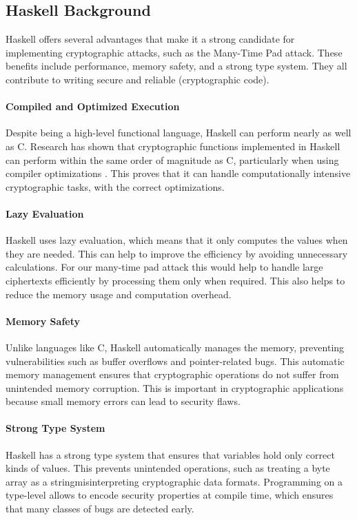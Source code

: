 \subsection{Haskell Background}
\label{sec:why_haskell}
Haskell offers several advantages that make it a strong candidate for implementing cryptographic attacks, 
such as the Many-Time Pad attack. These benefits include performance, memory safety, and a strong type system. 
They all contribute to writing secure and reliable (cryptographic code). 

\paragraph{Compiled and Optimized Execution} 
Despite being a high-level functional language, Haskell can perform nearly as well as C. 
Research has shown that cryptographic functions implemented in Haskell can perform within the same order of magnitude as C, 
particularly when using compiler optimizations \cite{tevis2006secure}. 
This proves that it can handle computationally intensive cryptographic tasks, with the correct optimizations.

\paragraph{Lazy Evaluation} 
Haskell uses lazy evaluation, which means that it only computes the values when they are needed. 
This can help to improve the efficiency by avoiding unnecessary calculations. 
For our many-time pad attack this would help to handle large ciphertexts efficiently by processing them only when required. 
This also helps to reduce the memory usage and computation overhead.

\paragraph{Memory Safety}
Unlike languages like C, Haskell automatically manages the memory, preventing vulnerabilities such as buffer overflows and pointer-related bugs. 
This automatic memory management ensures that cryptographic operations do not suffer from unintended memory corruption. 
This is important in cryptographic applications because small memory errors can lead to security flaws. 

\paragraph{Strong Type System}
Haskell has a strong type system that ensures that variables hold only correct kinds of values. 
This prevents unintended operations, such as treating a byte array as a stringmisinterpreting cryptographic data formats. 
Programming on a type-level allows to encode security properties at compile time, which ensures that many classes of bugs are detected early.

